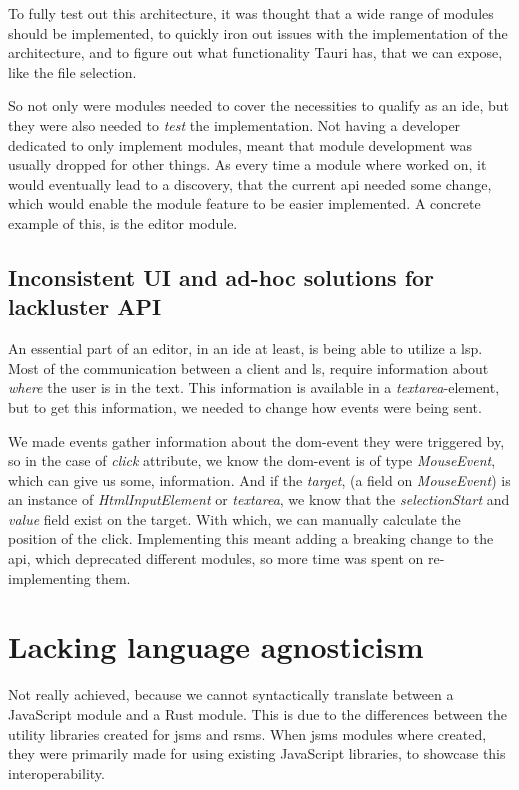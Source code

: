 To fully test out this architecture, it was thought that a wide range of modules
should be implemented, to quickly iron out issues with the implementation of the
architecture, and to figure out what functionality Tauri has, that we can
expose, like the file selection.

So not only were modules needed to cover the necessities to qualify as an
\gls*{ide}, but they were also needed to \textit{test} the implementation. Not
having a developer dedicated to only implement modules, meant that module
development was usually dropped for other things. As every time a module where
worked on, it would eventually lead to a discovery, that the current \gls*{api}
needed some change, which would enable the module feature to be easier
implemented. A concrete example of this, is the editor module.


\subsection{Inconsistent UI and ad-hoc solutions for lackluster API}

An essential part of an editor, in an \gls*{ide} at least, is being able to
utilize a \gls*{lsp}. Most of the communication between a client and \gls*{ls},
require information about \textit{where} the user is in the text. This
information is available in a \textit{textarea}-element, but to get this
information, we needed to change how events were being sent.

We made events gather information about the \gls*{dom}-event they were
triggered by, so in the case of \textit{click} attribute, we know the
\gls*{dom}-event is of type \textit{MouseEvent}, which can give us some,
information. And if the \textit{target}, (a field on \textit{MouseEvent}) is an
instance of \textit{HtmlInputElement} or \textit{textarea}, we know that the
\textit{selectionStart} and \textit{value} field exist on the target. With
which, we can manually calculate the position of the click. Implementing this
meant adding a breaking change to the \gls*{api}, which deprecated different
modules, so more time was spent on re-implementing them.


\section{Lacking language agnosticism} \label{sec:lla}

Not really achieved, because we cannot syntactically translate between a
JavaScript module and a Rust module. This is due to the differences between the
utility libraries created for \gls*{jsms} and \gls*{rsms}. When \gls*{jsms} modules
where created, they were primarily made for using existing JavaScript libraries,
to showcase this interoperability.

